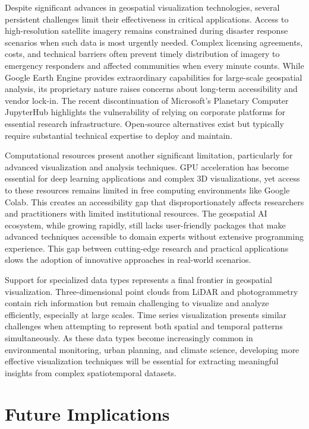 Despite significant advances in geospatial visualization technologies, several persistent challenges limit their effectiveness in critical applications. Access to high-resolution satellite imagery remains constrained during disaster response scenarios when such data is most urgently needed. Complex licensing agreements, costs, and technical barriers often prevent timely distribution of imagery to emergency responders and affected communities when every minute counts. While Google Earth Engine provides extraordinary capabilities for large-scale geospatial analysis, its proprietary nature raises concerns about long-term accessibility and vendor lock-in. The recent discontinuation of Microsoft's Planetary Computer JupyterHub highlights the vulnerability of relying on corporate platforms for essential research infrastructure. Open-source alternatives exist but typically require substantial technical expertise to deploy and maintain.

Computational resources present another significant limitation, particularly for advanced visualization and analysis techniques. GPU acceleration has become essential for deep learning applications and complex 3D visualizations, yet access to these resources remains limited in free computing environments like Google Colab. This creates an accessibility gap that disproportionately affects researchers and practitioners with limited institutional resources. The geospatial AI ecosystem, while growing rapidly, still lacks user-friendly packages that make advanced techniques accessible to domain experts without extensive programming experience. This gap between cutting-edge research and practical applications slows the adoption of innovative approaches in real-world scenarios.

Support for specialized data types represents a final frontier in geospatial visualization. Three-dimensional point clouds from LiDAR and photogrammetry contain rich information but remain challenging to visualize and analyze efficiently, especially at large scales. Time series visualization presents similar challenges when attempting to represent both spatial and temporal patterns simultaneously. As these data types become increasingly common in environmental monitoring, urban planning, and climate science, developing more effective visualization techniques will be essential for extracting meaningful insights from complex spatiotemporal datasets.

\section{Future Implications}\label{sec:Outlook}

